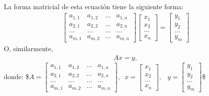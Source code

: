 \documentclass[letterpaper,10pt,english]{jupyterBook}
\begin{document}
\sphinxAtStartPar
La forma matricial de esta ecuación tiene la siguiente forma:
\begin{equation*}
\begin{split}\begin{bmatrix}
a_{1,1} & a_{1,2} & ... & a_{1,n}\\
a_{2,1} & a_{2,2} & ... & a_{2,n}\\
... & ... & ... & ... \\
a_{m,1} & a_{m,2} & ... & a_{m,n}
\end{bmatrix}\left[\begin{array}{c} x_1 \\x_2 \\ ... \\x_n \end{array}\right] =
\left[\begin{array}{c} y_1 \\y_2 \\ ... \\y_m \end{array}\right]\end{split}
\end{equation*}
\sphinxAtStartPar
O, similarmente,
\begin{equation*}
\begin{split}Ax = y,\end{split}
\end{equation*}
\sphinxAtStartPar
donde:
\$\(A = \begin{bmatrix}
a_{1,1} & a_{1,2} & ... & a_{1,n}\\
a_{2,1} & a_{2,2} & ... & a_{2,n}\\
... & ... & ... & ... \\
a_{m,1} & a_{m,2} & ... & a_{m,n}
\end{bmatrix},\;\;x= \left[\begin{array}{c} x_1 \\x_2 \\ ... \\x_n \end{array}\right],\;\;\ y = \left[\begin{array}{c} y_1 \\y_2 \\ ... \\y_m \end{array}\right]\)\$
\end{document}
